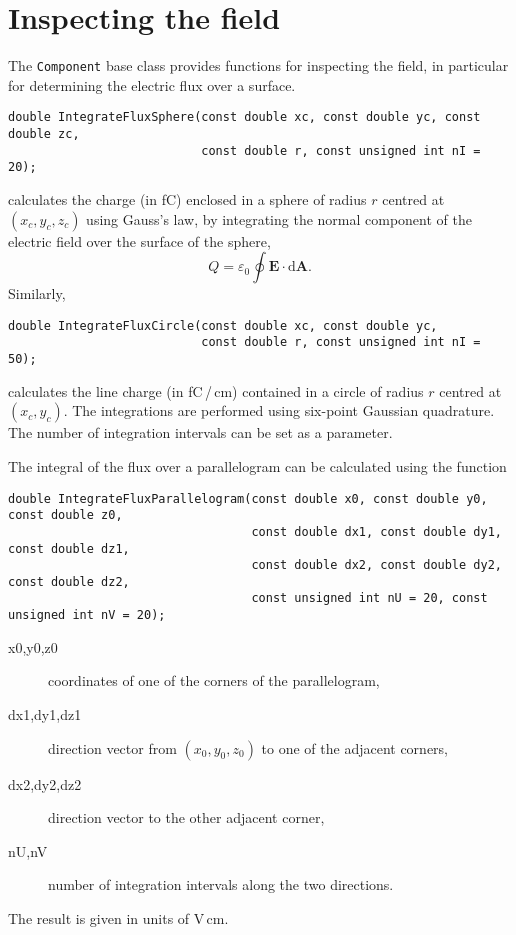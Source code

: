 \section{Inspecting the field}
The \texttt{Component} base class provides functions for inspecting the 
field, in particular for determining the electric flux over a surface.
\begin{lstlisting}
double IntegrateFluxSphere(const double xc, const double yc, const double zc,
                           const double r, const unsigned int nI = 20);
\end{lstlisting}
calculates the charge (in fC) enclosed in a sphere of radius $r$ centred at 
$\left(x_{c}, y_{c}, z_{c}\right)$ using Gauss's law, \ie by 
integrating the normal component of the electric field over the 
surface of the sphere, 
\begin{equation*}
  Q = \varepsilon_{0} \oint \mathbf{E}\cdot \text{d}\mathbf{A}.
\end{equation*}  
Similarly,
\begin{lstlisting}
double IntegrateFluxCircle(const double xc, const double yc, 
                           const double r, const unsigned int nI = 50);
\end{lstlisting}
calculates the line charge (in fC\,/\,cm) contained in a circle of radius $r$ 
centred at $\left(x_{c}, y_{c}\right)$.  
The integrations are performed using six-point Gaussian quadrature. 
The number of integration intervals can be set as a parameter. 

The integral of the flux over a parallelogram can be calculated using 
the function
\begin{lstlisting}
double IntegrateFluxParallelogram(const double x0, const double y0, const double z0,
                                  const double dx1, const double dy1, const double dz1,
                                  const double dx2, const double dy2, const double dz2,
                                  const unsigned int nU = 20, const unsigned int nV = 20); 
\end{lstlisting}
\begin{description}
  \item[x0,y0,z0] coordinates of one of the corners of the parallelogram,
  \item[dx1,dy1,dz1] direction vector from $\left(x_{0}, y_{0}, z_{0}\right)$ 
                     to one of the adjacent corners,
  \item[dx2,dy2,dz2] direction vector to the other adjacent corner,
  \item[nU,nV] number of integration intervals along the two directions.
\end{description}
The result is given in units of V\,cm.
